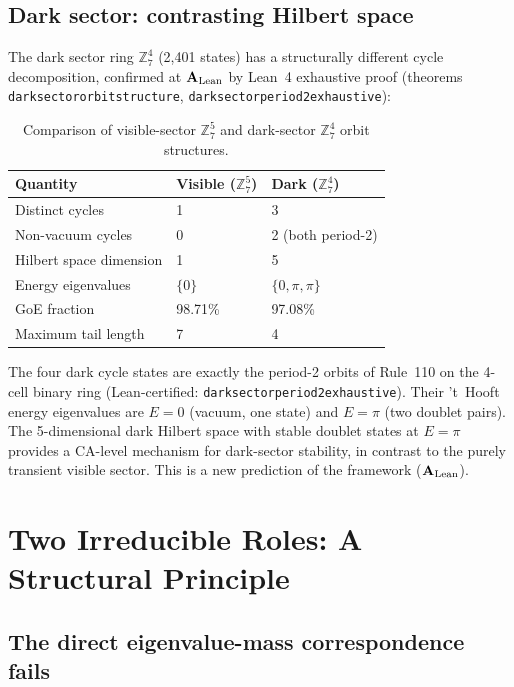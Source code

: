 \documentclass[11pt]{article}
\theoremstyle{remark}
\newcommand{\GTE}{\text{GTE}}
\newcommand{\lean}[1]{%
  \penalty-100
  \begingroup\def\_{\textunderscore\allowbreak}\texttt{#1}\endgroup}
\newcommand{\CatAL}{\ensuremath{\textbf{A}_{\rm Lean}}}
\begin{document}
\subsection{Dark sector: contrasting Hilbert space}
\label{ssec:dark}

The \GTE{} dark sector ring $\mathbb{Z}_7^4$ (2{,}401 states) has a
structurally different cycle decomposition, confirmed at \CatAL{}
by Lean~4 exhaustive proof (theorems
\lean{dark\_sector\_orbit\_structure},
\lean{dark\_sector\_period2\_exhaustive}):

\begin{table}[h!]
\centering
\caption{Comparison of visible-sector $\mathbb{Z}_7^5$ and dark-sector
$\mathbb{Z}_7^4$ orbit structures.}
\label{tab:dark}
\begin{tabular}{lll}
\toprule
Quantity & Visible ($\mathbb{Z}_7^5$) & Dark ($\mathbb{Z}_7^4$) \\
\midrule
Distinct cycles & 1 & 3 \\
Non-vacuum cycles & 0 & 2 (both period-2) \\
Hilbert space dimension & 1 & 5 \\
Energy eigenvalues & $\{0\}$ & $\{0, \pi, \pi\}$ \\
GoE fraction & 98.71\% & 97.08\% \\
Maximum tail length & 7 & 4 \\
\bottomrule
\end{tabular}
\end{table}

The four dark cycle states are exactly the period-2 orbits of Rule~110
on the 4-cell binary ring (Lean-certified: \lean{dark\_sector\_period2\_exhaustive}).
Their 't~Hooft energy eigenvalues are $E = 0$ (vacuum, one state) and
$E = \pi$ (two doublet pairs).
The 5-dimensional dark Hilbert space with stable doublet states at $E=\pi$
provides a CA-level mechanism for dark-sector stability, in contrast to
the purely transient visible sector.
This is a new prediction of the \GTE{} framework (\CatAL{}).

\section{Two Irreducible Roles: A Structural Principle}
\label{sec:two_role}

\subsection{The direct eigenvalue-mass correspondence fails}
\label{ssec:eigen_fail}
\end{document}
